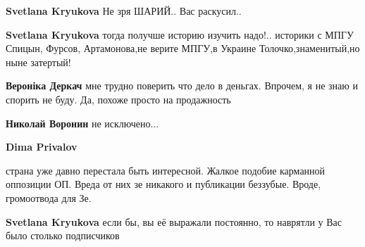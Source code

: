 \begin{itemize}
\begin{itemize}
\textbf{Svetlana Kryukova} Не зря ШАРИЙ..
Вас раскусил..

 
\textbf{Svetlana Kryukova} тогда получше историю изучить надо!.. историки с МПГУ Спицын, Фурсов, Артамонова,не верите МПГУ,в Украине Толочко,знаменитый,но ныне затертый!

 
\textbf{Вероніка Деркач} мне трудно поверить что дело в деньгах. Впрочем, я не знаю и спорить не буду. Да, похоже просто на продажность

 
\textbf{Николай Воронин} не исключено...

 
\textbf{Dima Privalov} 

страна уже давно перестала быть интересной. Жалкое подобие карманной оппозиции
ОП. Вреда от них зе никакого и публикации беззубые. Вроде, громоотвода для Зе.

 
\textbf{Svetlana Kryukova} если бы, вы её выражали постоянно, то наврятли у Вас было столько подписчиков

 

\end{itemize}
\end{itemize}
